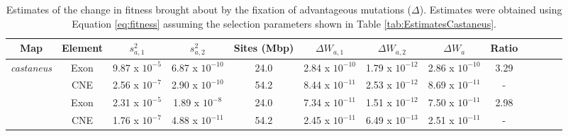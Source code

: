 \begin{sidewaystable}[H]
\caption{Estimates of the change in fitness brought about by the fixation of advantageous mutations ($\Delta$). Estimates were obtained using Equation \ref{eq:fitness} assuming the selection parameters shown in Table \ref{tab:EstimatesCastaneus}. }

\begin{tabular}{ccccccccccccc}
\toprule
       Map & Element &        $s^{2}_{a,1}$ &      $s^{2}_{a,2}$ &     Sites (Mbp) & $\Delta W_{a,1}$ &    $\Delta W_{a,2}$ &   $\Delta W_{a}$ & Ratio \\
\midrule
 \multirow{2}{*}{\textit{castaneus}} &    Exon  &  9.87 x $10^{-5}$  & 6.87 x $10^{-10}$  & 24.0 &  2.84 x $10^{-10}$  &  1.79 x $10^{-12}$  &  2.86 x $10^{-10}$  &  3.29 \\
  &     CNE  &  2.56 x $10^{-7}$ &  2.90 x $10^{-10}$  & 54.2 & 8.44 x $10^{-11}$  &  2.53 x $10^{-12}$  &  8.69 x $10^{-11}$  &         - \\ \hdashline
       \multirow{2}{*}{Cox} &     Exon  &  2.31 x $10^{-5}$ &  1.89 x $10^{-8}$  &  24.0 &  7.34 x $10^{-11}$  &  1.51 x $10^{-12}$  &  7.50 x $10^{-11}$ &  2.98 \\
        &     CNE  &  1.76 x $10^{-7}$ &  4.88 x $10^{-11}$  &  54.2 &  2.45 x $10^{-11}$  &  6.49 x $10^{-13}$  &  2.51 x $10^{-11}$ &         - \\
\bottomrule
\end{tabular}
 \label{tab:fitness}

\end{sidewaystable}
